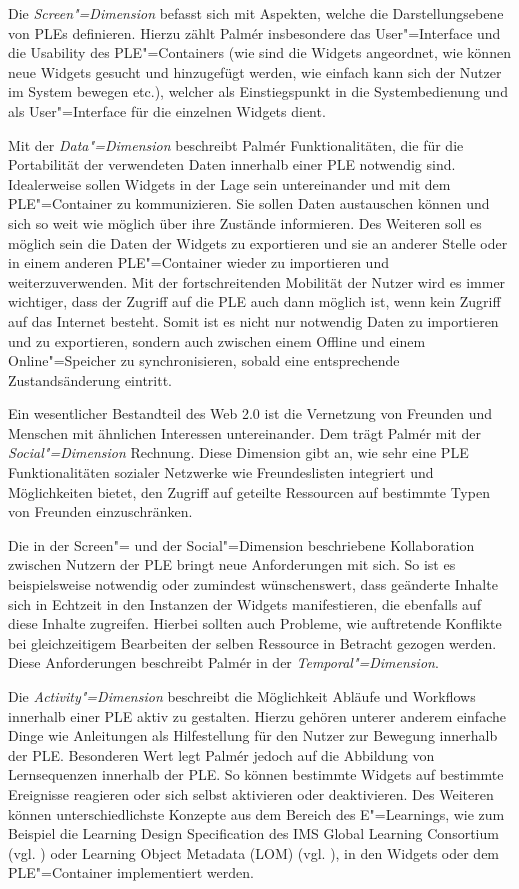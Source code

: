 Die \emph{Screen"=Dimension} befasst sich mit Aspekten, welche die Darstellungsebene von \acp{PLE} definieren. Hierzu zählt Palmér insbesondere das User"=Interface und die Usability des \ac{PLE}"=Containers (wie sind die Widgets angeordnet, wie können neue Widgets gesucht und hinzugefügt werden, wie einfach kann sich der Nutzer im System bewegen etc.), welcher als Einstiegspunkt in die Systembedienung und als User"=Interface für die einzelnen Widgets dient.

Mit der \emph{Data"=Dimension} beschreibt Palmér Funktionalitäten, die für die Portabilität der verwendeten Daten innerhalb einer \ac{PLE} notwendig sind. Idealerweise sollen Widgets in der Lage sein untereinander und mit dem \ac{PLE}"=Container zu kommunizieren. Sie sollen Daten austauschen können und sich so weit wie möglich über ihre Zustände informieren. Des Weiteren soll es möglich sein die Daten der Widgets zu exportieren und sie an anderer Stelle oder in einem anderen \ac{PLE}"=Container wieder zu importieren und weiterzuverwenden. Mit der fortschreitenden Mobilität der Nutzer wird es immer wichtiger, dass der Zugriff auf die \ac{PLE} auch dann möglich ist, wenn kein Zugriff auf das Internet besteht. Somit ist es nicht nur notwendig Daten zu importieren und zu exportieren, sondern auch zwischen einem Offline und einem Online"=Speicher zu synchronisieren, sobald eine entsprechende Zustandsänderung eintritt.

Ein wesentlicher Bestandteil des Web 2.0 ist die Vernetzung von Freunden und Menschen mit ähnlichen Interessen untereinander. Dem trägt Palmér mit der \emph{Social"=Dimension} Rechnung. Diese Dimension gibt an, wie sehr eine \ac{PLE} Funktionalitäten sozialer Netzwerke wie Freundeslisten integriert und Möglichkeiten bietet, den Zugriff auf geteilte Ressourcen auf bestimmte Typen von Freunden einzuschränken.

Die in der Screen"= und der Social"=Dimension beschriebene Kollaboration zwischen Nutzern der \ac{PLE} bringt neue Anforderungen mit sich. So ist es beispielsweise notwendig oder zumindest wünschenswert, dass geänderte Inhalte sich in Echtzeit in den Instanzen der Widgets manifestieren, die ebenfalls auf diese Inhalte zugreifen. Hierbei sollten auch Probleme, wie auftretende Konflikte bei gleichzeitigem Bearbeiten der selben Ressource in Betracht gezogen werden. Diese Anforderungen beschreibt Palmér in der \emph{Temporal"=Dimension}.

Die \emph{Activity"=Dimension} beschreibt die Möglichkeit Abläufe und Workflows innerhalb einer \ac{PLE} aktiv zu gestalten. Hierzu gehören unterer anderem einfache Dinge wie Anleitungen als Hilfestellung für den Nutzer zur Bewegung innerhalb der \ac{PLE}. Besonderen Wert legt Palmér jedoch auf die Abbildung von Lernsequenzen innerhalb der \ac{PLE}. So können bestimmte Widgets auf bestimmte Ereignisse reagieren oder sich selbst aktivieren oder deaktivieren. Des Weiteren können unterschiedlichste Konzepte aus dem Bereich des E"=Learnings, wie zum Beispiel die Learning Design Specification des IMS Global Learning Consortium (vgl. \cite{IMS2012}) oder Learning Object Metadata (LOM) (vgl. \cite{LOM2002}), in den Widgets oder dem \ac{PLE}"=Container implementiert werden.

